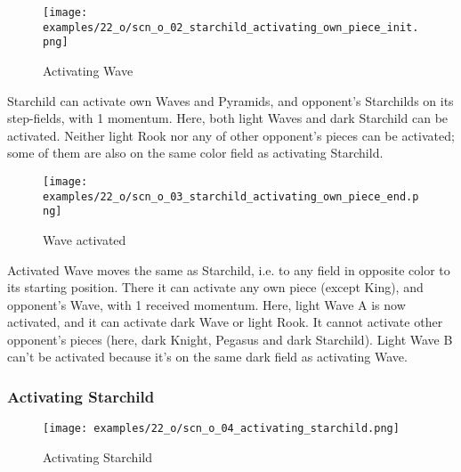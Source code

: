 \vspace*{-1.1\baselineskip}
\noindent
\begin{figure}[!h]
\texttt{[image: examples/22\_o/scn\_o\_02\_starchild\_activating\_own\_piece\_init.png]}
\caption{Activating Wave}
\label{fig:scn_o_02_starchild_activating_own_piece_init}
\end{figure}

Starchild can activate own Waves and Pyramids, and opponent's Starchilds on its step-fields,
with 1 momentum. Here, both light Waves and dark Starchild can be activated. Neither light
Rook nor any of other opponent's pieces can be activated; some of them are also on the same
color field as activating Starchild.

\clearpage %

\vspace*{-2.1\baselineskip}
\noindent
\begin{figure}[!h]
\texttt{[image: examples/22\_o/scn\_o\_03\_starchild\_activating\_own\_piece\_end.png]}
\caption{Wave activated}
\label{fig:scn_o_03_starchild_activating_own_piece_end}
\end{figure}

Activated Wave moves the same as Starchild, i.e. to any field in opposite color to its starting
position. There it can activate any own piece (except King), and opponent's Wave, with 1 received
momentum. Here, light Wave A is now activated, and it can activate dark Wave or light Rook. It
cannot activate other opponent's pieces (here, dark Knight, Pegasus and dark Starchild). Light
Wave B can't be activated because it's on the same dark field as activating Wave.

\clearpage %

\subsubsection*{Activating Starchild}

\vspace*{-1.3\baselineskip}
\noindent
\begin{figure}[!h]
\texttt{[image: examples/22\_o/scn\_o\_04\_activating\_starchild.png]}
\caption{Activating Starchild}
\label{fig:scn_o_04_activating_starchild}
\end{figure}

